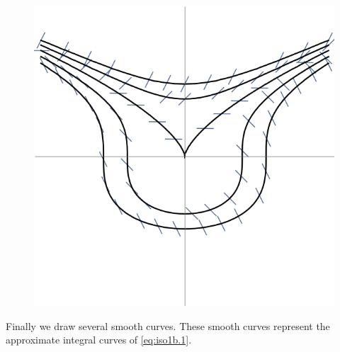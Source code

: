 \documentclass[../main-sheet.tex]{subfiles}
\begin{document}
\begin{soln}[b]
    \begin{figure}[H]
        \centering
        \includegraphics{pr1b.png}
    \end{figure}
    Finally we draw several smooth curves. These smooth curves represent the approximate integral curves of \eqref{eq:iso1b.1}.
\end{soln}
\end{document}
